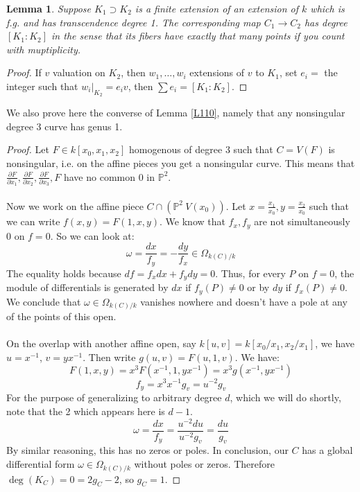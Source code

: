 \documentclass{article}
\newcommand{\Proj}{\mathbb{P}}
\newcommand{\p}{\partial}
\theoremstyle{plain}
\newtheorem{lem}[thm]{Lemma}
\theoremstyle{definition}
\theoremstyle{remark}
\begin{document}
\begin{lem}
\label{L111}
Suppose $K_1 \supset K_2$ is a finite extension of an extension of $k$ which is f.g. and has transcendence degree 1. The corresponding map $C_1 \to C_2$ has degree $[K_1 : K_2]$ in the sense that its fibers have exactly that many points if you count with muptiplicity.
\end{lem}
\begin{proof}
If $v$ valuation on $K_2$, then $w_1, \dots, w_i$ extensions of $v$ to $K_1$, set $e_i = $ the integer such that $w_i|_{K_2} = e_i v$, then $\sum e_i = [K_1 : K_2]$.
\end{proof}
We also prove here the converse of Lemma \ref{L110}, namely that any nonsingular degree 3 curve has genus 1.
\begin{proof}
Let $F \in k[x_0, x_1, x_2]$ homogenous of degree 3 such that $C = V(F)$ is nonsingular, i.e. on the affine pieces you get a nonsingular curve. This means that $\frac{\p F}{\p x_1}, \frac{\p F}{\p x_2}, \frac{\p F}{\p x_3}, F$ have no common 0 in $\Proj^2$.
\\
\\
Now we work on the affine piece $C \cap (\Proj^2 \ V(x_0))$. Let $x = \frac{x_1}{x_0}, y= \frac{x_2}{x_0}$ such that we can write $f(x,y) = F(1,x,y)$. We know that $f_x, f_y$ are not simultaneously 0 on $f=0$. So we can look at:
\[       \omega = \frac{dx}{f_y} = - \frac{dy}{f_x} \in \Omega_{k(C)/k}        \]
The equality holds because $df = f_x dx + f_y dy = 0$. Thus, for every $P$ on $f=0$, the module of differentials is generated by $dx$ if $f_y(P) \neq 0$ or by $dy$ if $f_x(P) \neq 0$. We conclude that $\omega \in \Omega_{k(C)/k}$ vanishes nowhere and doesn't have a pole at any of the points of this open.
\\
\\
On the overlap with another affine open, say $k[u,v] = k[x_0/x_1, x_2/x_1]$, we have $u = x^{-1}$, $v = yx^{-1}$. Then write $g(u,v) = F(u,1,v)$. We have:
\[       F(1,x,y) = x^3 F(x^{-1}, 1, yx^{-1}) = x^3 g(x^{-1}, yx^{-1})        \]
\[      f_y = x^3 x^{-1} g_v = u^{-2} g_v      \]
For the purpose of generalizing to arbitrary degree $d$, which we will do shortly, note that the 2 which appears here is $d-1$.
\[     \omega = \frac{dx}{f_y} = \frac{u^{-2} du }{u^{-2} g_v} = \frac{du}{g_v}  \]
By similar reasoning, this has no zeros or poles. In conclusion, our $C$ has a global differential form $\omega \in \Omega_{k(C)/k}$ without poles or zeros. Therefore $\deg(K_C) = 0 = 2g_C - 2$, so $g_C = 1$.
\end{proof}
\end{document}

